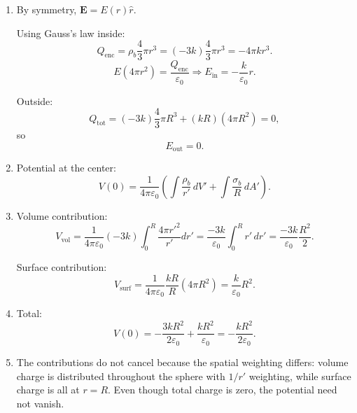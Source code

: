 \documentclass[12pt]{article}
\begin{document}
\begin{enumerate}
\begin{enumerate}
    \item By symmetry, $\mathbf{E} = E(r)\hat{r}$.

    Using Gauss's law inside:
    \[
    Q_{\text{enc}} = \rho_b \frac{4}{3}\pi r^3 = (-3k)\frac{4}{3}\pi r^3 = -4\pi k r^3.
    \]
    \[
    E(4\pi r^2) = \frac{Q_{\text{enc}}}{\varepsilon_0} \Rightarrow
    \boxed{E_{\text{in}} = -\frac{k}{\varepsilon_0}r.}
    \]

    Outside:
    \[
    Q_{\text{tot}} = (-3k)\frac{4}{3}\pi R^3 + (kR)(4\pi R^2) = 0,
    \]
    so
    \[
    \boxed{E_{\text{out}} = 0.}
    \]

    \item Potential at the center:
    \[
    V(0) = \frac{1}{4\pi\varepsilon_0}\left(
    \int \frac{\rho_b}{r'}\,dV' + \int \frac{\sigma_b}{R}\,dA'
    \right).
    \]

    \item Volume contribution:
    \[
    V_{\text{vol}} = \frac{1}{4\pi\varepsilon_0}(-3k)\int_0^R \frac{4\pi r'^2}{r'}dr'
    = \frac{-3k}{\varepsilon_0}\int_0^R r'\,dr'
    = \frac{-3k}{\varepsilon_0}\frac{R^2}{2}.
    \]

    Surface contribution:
    \[
    V_{\text{surf}} = \frac{1}{4\pi\varepsilon_0}\frac{kR}{R}(4\pi R^2)
    = \frac{k}{\varepsilon_0}R^2.
    \]

    \item Total:
    \[
    V(0) = -\frac{3kR^2}{2\varepsilon_0} + \frac{kR^2}{\varepsilon_0}
    = \boxed{-\frac{kR^2}{2\varepsilon_0}.}
    \]

    \item The contributions do not cancel because the spatial weighting differs: volume charge is distributed throughout the sphere with $1/r'$ weighting, while surface charge is all at $r=R$. Even though total charge is zero, the potential need not vanish.
\end{enumerate}

\end{enumerate}
\end{document}
